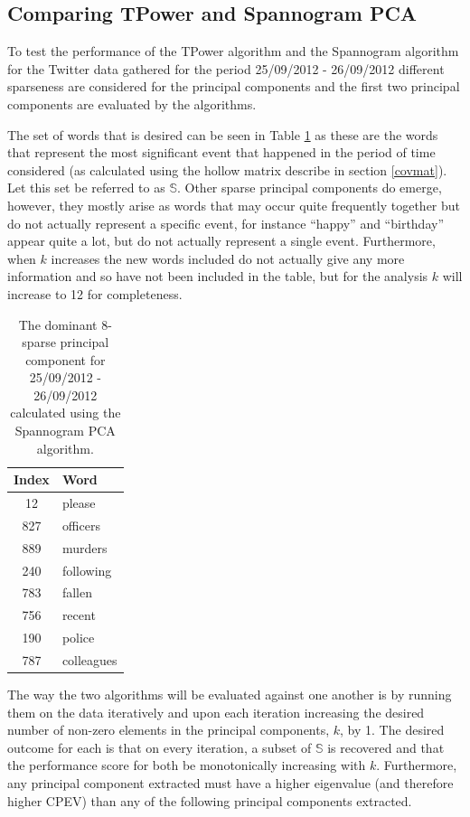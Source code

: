 \documentclass[11pt,a4paper]{article}
\begin{document}
\subsection{Comparing TPower and Spannogram PCA}
\label{comparison}
To test the performance of the TPower algorithm and the Spannogram algorithm for the Twitter data gathered for the period 25/09/2012 - 26/09/2012 different sparseness are considered for the principal components and the first two principal components are evaluated by the algorithms. 

The set of words that is desired can be seen in Table \ref{murder_8} as these are the words that represent the most significant event that happened in the period of time considered (as calculated using the hollow matrix describe in section \ref{covmat}). Let this set be referred to as $\mathbb{S}$. Other sparse principal components do emerge, however, they mostly arise as words that may occur quite frequently together but do not actually represent a specific event, for instance ``happy'' and ``birthday'' appear quite  a lot, but do not actually represent a single event. Furthermore, when $k$ increases the new words included do not actually give any more information and so have not been included in the table, but for the analysis $k$ will increase to 12 for completeness.

\begin{table}[H]
\center
\begin{tabular}{| c l |}
\hline
Index & Word \\
\hline
12 & please\\
827 & officers \\
889 & murders \\
240 & following\\
783 & fallen \\
756 & recent\\ 
190 & police\\
787 & colleagues\\
\hline
\end{tabular}
\caption{The dominant 8-sparse principal component for 25/09/2012 - 26/09/2012 calculated using the Spannogram PCA algorithm.}
\label{murder_8}
\end{table}

The way the two algorithms will be evaluated against one another is by running them on the data iteratively and upon each iteration increasing the desired number of non-zero elements in the principal components, $k$, by 1. The desired outcome for each is that on every iteration, a subset of $\mathbb{S}$ is recovered and that the performance score for both be monotonically increasing with $k$. Furthermore, any principal component extracted must have a higher eigenvalue (and therefore higher CPEV) than any of the following principal components extracted. 
\end{document}

